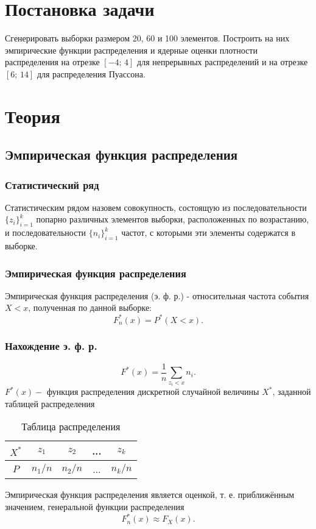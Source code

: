 \documentclass[a4paper]{article}
\begin{document}
    
    \tableofcontents
    \newpage
    \listoftables
    \newpage
	\listoffigures
    \newpage
\section {Постановка задачи}
\noindent Сгенерировать выборки размером 20, 60 и 100 элементов. Построить на них эмпирические функции распределения и ядерные оценки плотности распределения на отрезке $[-4;\,4]$ для непрерывных распределений и на отрезке $[6;\,14]$ для распределения Пуассона.

\section {Теория}
\subsection{Эмпирическая функция распределения}
\subsubsection{Статистический ряд}
\noindent Статистическим рядом назовем совокупность, состоящую из последовательности $\displaystyle\{z_i\}_{i=1}^k$ попарно различных элементов выборки, расположенных по возрастанию, и последовательности $\displaystyle\{n_i\}_{i=1}^k$ частот, с которыми эти элементы содержатся в выборке.
\subsubsection{Эмпирическая функция распределения}
\noindent Эмпирическая функция распределения (э. ф. р.) - относительная частота события $X < x$, полученная по данной выборке:
\begin{equation}
    F_n^*(x)=P^*(X<x).
\end{equation}
\subsubsection{Нахождение э. ф. р.}
\begin{equation}
    F^*(x)=\frac{1}{n}\sum_{z_i<x}n_i.
\end{equation}
$F^*(x)-$ функция распределения дискретной случайной величины $X^*$, заданной таблицей распределения
\begin{table}[H]
    \centering
    \begin{tabular}{|c|c|c|c|c|}
        \hline
         $X^*$&$z_1$&$z_2$&...&$z_k$\\
         \hline
         $P$&$n_1/n$&$n_2/n$&...&$n_k/n$\\
         \hline
    \end{tabular}
    \caption{Таблица распределения}
    \label{tab:my_label}
\end{table}
\noindent Эмпирическая функция распределения является оценкой, т. е. приближённым значением, генеральной функции распределения
\begin{equation}
    F_n^*(x)\approx F_X(x).
\end{equation}
\end{document}
